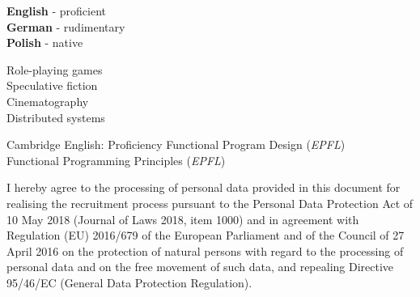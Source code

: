 \documentclass[9pt]{style/developercv}
\begin{document}

\begin{minipage}[t]{0.3\textwidth}
    \vspace{-\baselineskip}


    \textbf{English} - proficient\\
    \textbf{German} - rudimentary\\
    \textbf{Polish} - native
\end{minipage}
\hfill
\begin{minipage}[t]{0.3\textwidth}
    \vspace{-\baselineskip}
    
    
    Role-playing games\\
    Speculative fiction\\
    Cinematography\\
    Distributed systems
\end{minipage}
\hfill
\begin{minipage}[t]{0.3\textwidth}
    \vspace{-\baselineskip}
    
    
    Cambridge English: Proficiency
    Functional Program Design (\textit{EPFL})\\
    Functional Programming Principles (\textit{EPFL})
\end{minipage}


\vspace{1.00cm}

\begin{minipage}[t]{1\textwidth}
    \footnotesize{I hereby agree to the processing of personal data provided in this document for 
    realising the recruitment process pursuant to the Personal Data Protection Act
    of 10 May 2018 (Journal of Laws 2018, item 1000) and in agreement with Regulation (EU) 
    2016/679 of the European Parliament and of the Council of 27 April 2016 on the 
    protection of natural persons with regard to the processing of personal data and on 
    the free movement of such data, and repealing Directive 95/46/EC (General Data 
    Protection Regulation).}
\end{minipage}
\end{document}
